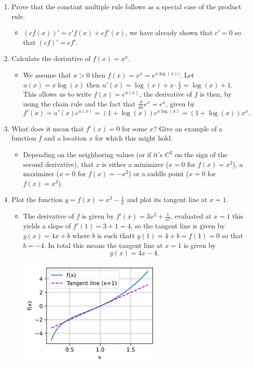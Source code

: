 \documentclass{article}
\begin{document}
\begin{enumerate}
\item Prove that the constant multiple rule follows as a special case of the product rule.
	\begin{itemize}
	\item $(cf(x))' = c' f(x) + c f'(x)$, we have already shown that $c' = 0$ so that $(cf)' = cf'$.
	\end{itemize}

\item Calculate the derivative of $f(x) = x^x$. 
	\begin{itemize}
	\item We assume that $x > 0$ then $f(x) = x^x = e^{x \log(x))}$. Let $u(x) = x \log(x)$ then $u'(x) = \log(x) + x \cdot \frac{1}{x} = \log(x) + 1$. This allows us to write $f(x) = e^{u(x)}$, the derivative of $f$ is then, by using the chain rule and the fact that $\frac{d}{dx} e^x = e^x$, given by
	$$
	f'(x) = u'(x) e^{u(x)} = (1 + \log(x))e^{x \log(x)} = (1 + \log(x))x^x.
	$$
	\end{itemize}

\item What does it mean that $f'(x) = 0$ for some $x$? Give an example of a function $f$ and a location $x$ for which this might hold.
	\begin{itemize}
	\item Depending on the neighboring values (or if it's $C^2$ on the sign of the second derivative), that $x$ is either a minimizer ($x = 0$ for $f(x) = x^2$), a maximizer ($x = 0$ for $f(x) = -x^2$) or a saddle point ($x = 0$ for $f(x) = x^3$).
	\end{itemize}

\item Plot the function $y = f(x) = x^3 - \frac{1}{x}$ and plot its tangent line at $x = 1$.
	\begin{itemize}
	\item The derivative of $f$ is given by $f'(x) = 3x^2 + \frac{1}{x^2}$, evaluated at $x = 1$ this yields a slope of $f'(1) = 3 + 1 = 4$, so the tangent line is given by $y(x) = 4x + b$ where $b$ is such thatt $y(1) = 4 + b = f(1) = 0$ so that $b = -4$. In total this means the tangent line at $x = 1$ is given by
	$$
	y(x) = 4x - 4.
	$$
	\begin{center}
    	\includegraphics[width=0.6\textwidth]{Images/2_4_6.png}
    \end{center}
	\end{itemize}


\end{enumerate}
\end{document}
